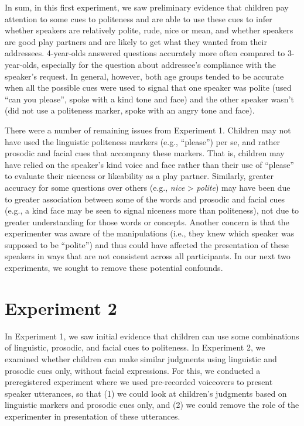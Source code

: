 \documentclass[10pt, letterpaper]{article}
\begin{document}
In sum, in this first experiment, we saw preliminary evidence that
children pay attention to some cues to politeness and are able to use
these cues to infer whether speakers are relatively polite, rude, nice
or mean, and whether speakers are good play partners and are likely to
get what they wanted from their addressees. 4-year-olds answered
questions accurately more often compared to 3-year-olds, especially for
the question about addressee's compliance with the speaker's request. In
general, however, both age groups tended to be accurate when all the
possible cues were used to signal that one speaker was polite (used
``can you please'', spoke with a kind tone and face) and the other
speaker wasn't (did not use a politeness marker, spoke with an angry
tone and face).

There were a number of remaining issues from Experiment 1. Children may
not have used the linguistic politeness markers (e.g., ``please'') per
se, and rather prosodic and facial cues that accompany these markers.
That is, children may have relied on the speaker's kind voice and face
rather than their use of ``please'' to evaluate their niceness or
likeability as a play partner. Similarly, greater accuracy for some
questions over others (e.g., \emph{nice} \textgreater{} \emph{polite})
may have been due to greater association between some of the words and
prosodic and facial cues (e.g., a kind face may be seen to signal
niceness more than politeness), not due to greater understanding for
those words or concepts. Another concern is that the experimenter was
aware of the manipulations (i.e., they knew which speaker was supposed
to be ``polite'') and thus could have affected the presentation of these
speakers in ways that are not consistent across all participants. In our
next two experiments, we sought to remove these potential confounds.

\section{Experiment 2}\label{experiment-2}

In Experiment 1, we saw initial evidence that children can use some
combinations of linguistic, prosodic, and facial cues to politeness. In
Experiment 2, we examined whether children can make similar judgments
using linguistic and prosodic cues only, without facial expressions. For
this, we conducted a preregistered experiment where we used pre-recorded
voiceovers to present speaker utterances, so that (1) we could look at
children's judgments based on linguistic markers and prosodic cues only,
and (2) we could remove the role of the experimenter in presentation of
these utterances.
\end{document}
